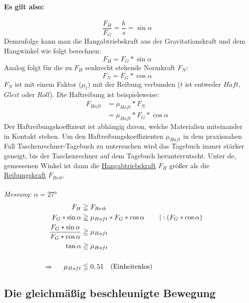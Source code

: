 \documentclass[12pt]{article}
\numberwithin{equation}{subsection}
\begin{document}
	\paragraph{Es gilt also:}
	\begin{equation}
		\dfrac{F_H}{F_G} = \dfrac{h}{s} = \sin\alpha
	\end{equation}
	Demzufolge kann man die Hangabtriebskraft aus der Gravitationskraft und dem Hangwinkel wie folgt berechnen:
	\begin{equation}
	F_H = F_G*\sin\alpha
	\end{equation}
	Analog folgt für die zu $ F_H $ senkrecht stehende Normkraft $ F_N $:
	\begin{equation}
	F_N = F_G*\cos\alpha
	\end{equation}
	$ F_N $ ist mit einem Faktor ($ \mu_t $) mit der Reibung verbunden ($ t $ ist entweder $ Haft $, $ Gleit $ oder $ Roll $). Die Haftreibung ist beispielsweise:
	\begin{align}
		F_{Haft} &= \mu_{Haft}*F_N\\
		&= \mu_{Haft}*F_G*\cos\alpha
	\end{align}
	Der Haftreibungskoeffizient ist abhängig davon, welche Materialien miteinander in Kontakt stehen.
	Um den Haftreibungskoeffizienten $ \mu_{Haft} $ in dem praxisnahen Fall Taschenrechner-Tagebuch zu untersuchen wird das Tagebuch immer stärker geneigt, bis der Taschenrechner auf dem Tagebuch herunterrutscht. Unter de, gemessenen Winkel ist dann die \underline{Hangabtriebskraft} $ F_H $ größer als die \underline{Reibungskraft} $ F_{Reib} $.\\\\
	\emph{Messung:} $ \alpha = 27° $
	\begin{align}
		F_H &\geqq F_{Reib}\\
		F_G*\sin\alpha &\geqq \mu_{Haft}*F_G*\cos\alpha\ && |:(F_G*\cos\alpha)\\
		\dfrac{F_G*\sin\alpha}{F_G*\cos\alpha} &\geqq \mu_{Haft}\\
		\tan\alpha &\geqq \mu_{Haft}\\
		\nonumber\\
		\Rightarrow\hspace{0.5cm} \mu_{Haft} &\leqq 0,51 \quad \text{(Einheitenlos)}
	\end{align}
	
	\subsection{Die gleichmäßig beschleunigte Bewegung}
\end{document}
